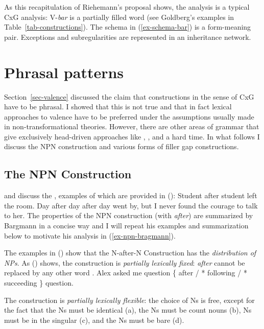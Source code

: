 \documentclass[output=paper,biblatex,babelshorthands,newtxmath,draftmode,colorlinks,citecolor=brown]{langscibook}
\begin{document}
As this recapitulation of Riehemann's proposal shows, the analysis is a typical CxG analysis:
V-\emph{bar} is a partially filled word (see Goldberg's examples in
Table~\ref{tab-constructions}). The schema in (\ref{ex-schema-bar}) is a form-meaning
pair. Exceptions and subregularities are represented in an inheritance network.

\section{Phrasal patterns}
\label{sec-phrasal-patterns}
\label{sec-phrasal}

Section~\ref{sec-valence} discussed the claim that constructions in the sense of CxG have to be phrasal. I
showed that this is not true and that in fact lexical approaches to valence have to be preferred
under the assumptions usually made in non-transformational theories. However, there are other areas
of grammar that give exclusively head-driven approaches like \cg, \minimalism, and \dg a hard
time. In what follows I discuss the NPN construction and various forms of filler gap constructions.

\subsection{The NPN Construction}
\label{sec-npn}

\citet{Matsuyama2004a} and \citet{Jackendoff2008a} discuss the , examples
of
which are provided in ():
\eal
\ex Student after student left the room.
\ex
\label{cxg:ex-npn-iteration}
Day after day after day went by, but I never found the courage to talk to
her. \citep{Bargmann2015a}
\zl
The properties of the NPN construction (with \emph{after})  are summarized by Barg\-mann \citeyearpar{Bargmann2015a}
in a concise way and I will repeat his examples and summarization below to motivate his analysis in (\ref{ex-npn-bragmann}).

The examples in () show that the N-after-N Construction has the \emph{distribution of NPs}.
As () shows, the construction is \emph{partially lexically fixed}: \emph{after} cannot be
replaced by any other word \citep[]{Matsuyama2004a}.
\ea
Alex asked me question \{ after / * following / * succeeding \} question.
\z

\largerpage
The construction is \emph{partially lexically flexible}: the choice of Ns is free, except for the fact that
the Ns must be identical (a), the Ns must be count nouns (b), Ns must be in the
singular (c), and the Ns must be bare (d).
\end{document}
